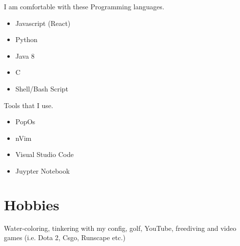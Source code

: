 \documentclass[letterpaper,
		10pt]{article}
\begin{document}
I am comfortable with these Programming languages.
\begin{itemize}
    \item Javascript (React)
	\item Python
	\item Java 8
	\item C
	\item Shell/Bash Script
\end{itemize}
Tools that I use.
\begin{itemize}
	\item PopOs
	\item nVim
	\item Visual Studio Code
	\item Juypter Notebook
\end{itemize}

\section{Hobbies}

Water-coloring, tinkering with my config, golf, YouTube, freediving and video games (i.e. Dota 2, Csgo, Runscape etc.)
\end{document}
